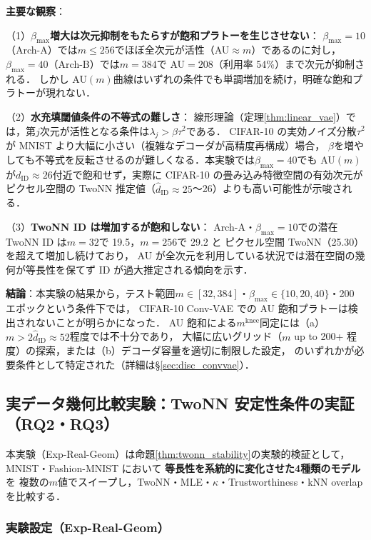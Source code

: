 \documentclass[11pt,a4paper]{jsarticle}
\newcommand{\kap}{\kappa}
\newcommand{\mknee}{m^{\mathrm{knee}}}
\begin{document}
\textbf{主要な観察}：

（1）\textbf{$\beta_{\max}$増大は次元抑制をもたらすが飽和プラトーを生じさせない}：
$\beta_{\max}=10$（Arch-A）では$m \leq 256$でほぼ全次元が活性（AU$\approx m$）であるのに対し，
$\beta_{\max}=40$（Arch-B）では$m=384$で AU$=208$（利用率 54\%）まで次元が抑制される．
しかし AU$(m)$曲線はいずれの条件でも単調増加を続け，明確な飽和プラトーが現れない．

（2）\textbf{水充填閾値条件の不等式の難しさ}：
線形理論（定理\ref{thm:linear_vae}）では，第$j$次元が活性となる条件は$\lambda_j > \beta \tau^2$である．
CIFAR-10 の実効ノイズ分散$\tau^2$が MNIST より大幅に小さい（複雑なデコーダが高精度再構成）場合，
$\beta$を増やしても不等式を反転させるのが難しくなる．本実験では$\beta_{\max}=40$でも
AU$(m)$が$d_{\mathrm{ID}} \approx 26$付近で飽和せず，実際に CIFAR-10 の畳み込み特徴空間の有効次元が
ピクセル空間の TwoNN 推定値（$\hat{d}_{\mathrm{ID}} \approx 25$〜26）よりも高い可能性が示唆される．

（3）\textbf{TwoNN ID は増加するが飽和しない}：
Arch-A・$\beta_{\max}=10$での潜在 TwoNN ID は$m=32$で 19.5，$m=256$で 29.2 と
ピクセル空間 TwoNN（25.30）を超えて増加し続けており，
AU が全次元を利用している状況では潜在空間の幾何が等長性を保てず ID が過大推定される傾向を示す．

\textbf{結論}：本実験の結果から，テスト範囲$m \in [32, 384]$・$\beta_{\max} \in \{10, 20, 40\}$・200 エポックという条件下では，
CIFAR-10 Conv-VAE での AU 飽和プラトーは検出されないことが明らかになった．
AU 飽和による$\mknee$同定には（a）$m > 2\hat{d}_{\mathrm{ID}} \approx 52$程度では不十分であり，
大幅に広いグリッド（$m$ up to 200+ 程度）の探索，または（b）デコーダ容量を適切に制限した設定，
のいずれかが必要条件として特定された（詳細は§\ref{sec:disc_convvae}）．

\subsection{実データ幾何比較実験：TwoNN 安定性条件の実証（RQ2・RQ3）}\label{sec:exp_real_geom}

本実験（Exp-Real-Geom）は命題\ref{thm:twonn_stability}の実験的検証として，
MNIST・Fashion-MNIST において \textbf{等長性を系統的に変化させた4種類のモデル}を
複数の$m$値でスイープし，TwoNN・MLE・$\kap$・Trustworthiness・kNN overlap を比較する．

\subsubsection*{実験設定（Exp-Real-Geom）}
\end{document}
